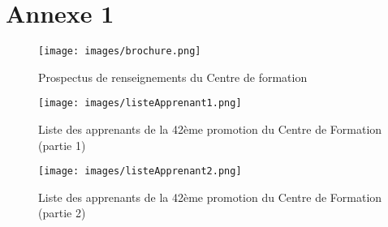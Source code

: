 \chapter{Annexe 1}
\begin{figure}[H]
\begin{center}
	\texttt{[image: images/brochure.png]}
	\caption{Prospectus de renseignements du Centre de formation}
\end{center}
\end{figure}

\begin{figure}[H]
\begin{center}
	\texttt{[image: images/listeApprenant1.png]}
	\caption{Liste des apprenants de la 42ème promotion du Centre de Formation (partie 1)}
\end{center}
\end{figure}

\begin{figure}[H]
\begin{center}
	\texttt{[image: images/listeApprenant2.png]}
	\caption{Liste des apprenants de la 42ème promotion du Centre de Formation (partie 2)}
\end{center}
\end{figure}
